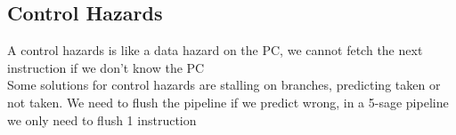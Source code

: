 \subsection*{Control Hazards}
A control hazards is like a data hazard on the PC, we cannot fetch the next
instruction if we don't know the PC\\
Some solutions for control hazards are stalling on branches, predicting taken
or not taken. We need to flush the pipeline if we predict wrong, in a 5-sage
pipeline we only need to flush 1 instruction\\

